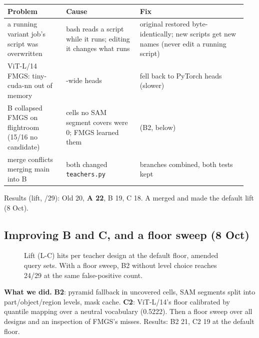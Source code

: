 \documentclass[11pt,a4paper]{article}
\newcommand{\code}[1]{\texttt{#1}}
\begin{document}
\begin{center}\small
\begin{tabular}{@{}>{\raggedright\arraybackslash}p{0.236\linewidth}>{\raggedright\arraybackslash}p{0.291\linewidth}>{\raggedright\arraybackslash}p{0.421\linewidth}@{}}
\toprule
\textbf{Problem} & \textbf{Cause} & \textbf{Fix} \\
\midrule
a running variant job's script was overwritten & bash reads a script while it runs; editing it changes what runs & original restored byte-identically; new scripts get new names (never edit a running script) \\
ViT-L/14 FMGS: tiny-cuda-nn out of memory & 768-wide heads & fell back to PyTorch heads (slower) \\
B collapsed FMGS on flightroom (15/16 no candidate) & cells no SAM segment covers were 0; FMGS learned them & (B2, below) \\
merge conflicts merging main into B & both changed \code{teachers.py} & branches combined, both tests kept \\
\bottomrule
\end{tabular}
\end{center}
Results (lift, /29): Old 20, \textbf{A 22}, B 19, C 18. A merged and made the default lift (8 Oct).

\subsection{Improving B and C, and a floor sweep (8 Oct)}
\begin{figure}[ht]
\centering
{}
\caption{Lift (L-C) hits per teacher design at the default floor, amended query sets. With a floor sweep, B2 without
level choice reaches 24/29 at the same false-positive count.}
\end{figure}
\textbf{What we did.} \textbf{B2}: pyramid fallback in uncovered cells, SAM segments split into part/object/region levels, mask cache. \textbf{C2}: ViT-L/14's floor calibrated by quantile mapping over a neutral vocabulary (0.5222). Then a floor sweep over all designs and an inspection of FMGS's misses. Results: B2 21, C2 19 at the default floor.
\end{document}
